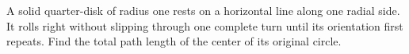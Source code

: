 A solid quarter-disk of radius one rests on a horizontal line along one radial side. It rolls right without slipping through one complete turn until its orientation first repeats. Find the total path length of the center of its original circle.
